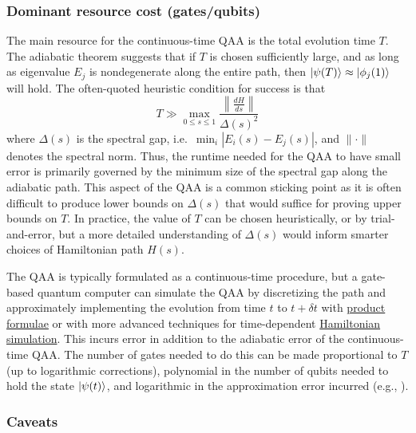 \begin{refsection}

\subsubsection*{Dominant resource cost (gates/qubits)}

The main resource for the continuous-time QAA is the total evolution time $T$. The adiabatic theorem suggests that if $T$ is chosen sufficiently large, and as long as eigenvalue $E_j$ is nondegenerate along the entire path, then $\lvert\psi(T)\rangle \approx \lvert\phi_j(1)\rangle$ will hold. The often-quoted heuristic condition \cite{albash2018AQCreview} for success is that
\begin{equation}\label{eq:adiabatic_condition}
    T \gg \max_{0 \leq s \leq 1} \frac{\left\lVert \frac{dH}{ds}\right\rVert}{\Delta(s)^2}
\end{equation}
where $\Delta(s)$ is the spectral gap, i.e.~$\min_{i}|E_i(s)-E_j(s)|$, and $\lVert \cdot \rVert$ denotes the spectral norm. Thus, the runtime needed for the QAA to have small error is primarily governed by the minimum size of the spectral gap along the adiabatic path. This aspect of the QAA is a common sticking point as it is often difficult to produce lower bounds on $\Delta(s)$ that would suffice for proving upper bounds on $T$. In practice, the value of $T$ can be chosen heuristically, or by trial-and-error, but a more detailed understanding of $\Delta(s)$ would inform smarter choices of Hamiltonian path $H(s)$.

The QAA is typically formulated as a continuous-time procedure, but a gate-based quantum computer can simulate the QAA by discretizing the path and approximately implementing the evolution from time $t$ to $t+ \delta t$ with \hyperref[prim:ProductFormulae]{product formulae} or with more advanced techniques for time-dependent \hyperref[prim:HamiltonianSimulation]{Hamiltonian simulation}. This incurs error in addition to the adiabatic error of the continuous-time QAA. The number of gates needed to do this can be made proportional to $T$ (up to logarithmic corrections), polynomial in the number of qubits needed to hold the state $\lvert\psi(t)\rangle$, and logarithmic in the approximation error incurred (e.g., \cite{kieferova2019DysonSeriesSimulation}). 



\subsubsection*{Caveats}


\end{refsection}
